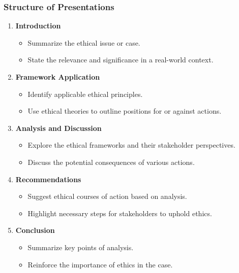 \documentclass[aspectratio=169]{beamer}
\begin{document}
\begin{frame}[fragile]
    \frametitle{Structure of Presentations}
    \begin{enumerate}
        \item \textbf{Introduction}
        \begin{itemize}
            \item Summarize the ethical issue or case.
            \item State the relevance and significance in a real-world context.
        \end{itemize}
        
        \item \textbf{Framework Application}
        \begin{itemize}
            \item Identify applicable ethical principles.
            \item Use ethical theories to outline positions for or against actions.
        \end{itemize}
        
        \item \textbf{Analysis and Discussion}
        \begin{itemize}
            \item Explore the ethical frameworks and their stakeholder perspectives.
            \item Discuss the potential consequences of various actions.
        \end{itemize}
        
        \item \textbf{Recommendations}
        \begin{itemize}
            \item Suggest ethical courses of action based on analysis.
            \item Highlight necessary steps for stakeholders to uphold ethics.
        \end{itemize}
        
        \item \textbf{Conclusion}
        \begin{itemize}
            \item Summarize key points of analysis.
            \item Reinforce the importance of ethics in the case.
        \end{itemize}
    \end{enumerate}
\end{frame}
\end{document}
